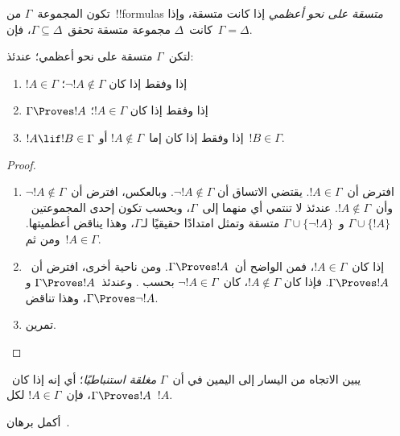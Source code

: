 \documentclass[../../../include/open-logic-section]{subfiles}
\begin{document}


\begin{defn}
تكون المجموعة~$\Gamma$ من~!!{formula}s \emph{متسقة على نحو أعظمي} إذا
كانت متسقة، وإذا كانت~$\Delta$ مجموعة متسقة تحقق~$\Gamma\subseteq\Delta$،
فإن~$\Gamma=\Delta$.
\end{defn}

\begin{lem}[لمّة الصدق]
لتكن~$\Gamma$ متسقة على نحو أعظمي؛ عندئذ:
\begin{enumerate}
\item {} $!A\in\Gamma$ إذا وفقط إذا كان
  $\lnot !A\notin\Gamma$؛
\item {} $\Gamma\Proves !A$ إذا وفقط إذا كان
  $!A\in\Gamma$؛
\item {} $!A\lif !B\in\Gamma$ إذا وفقط إذا كان
  إما~$!A\notin\Gamma$ أو~$!B\in\Gamma$.
\end{enumerate}
\end{lem}

\begin{proof}
\begin{enumerate}
\item افترض أن~$!A\in\Gamma$. يقتضي الاتساق أن
  $\lnot !A\notin\Gamma$. وبالعكس، افترض أن~$\lnot !A\notin\Gamma$
  وأن~$!A\notin\Gamma$. عندئذ لا تنتمي أي منهما إلى~$\Gamma$، وبحسب
   تكون إحدى المجموعتين~$\Gamma\cup\{!A\}$
  و~$\Gamma\cup\{\lnot !A\}$ متسقة وتمثل امتدادًا حقيقيًا لـ$\Gamma$،
  وهذا يناقض أعظميتها. ومن ثم~$!A\in\Gamma$.
\item إذا كان~$!A\in\Gamma$، فمن الواضح أن~$\Gamma\Proves !A$.
  ومن ناحية أخرى، افترض أن~$\Gamma\Proves !A$. فإذا كان
  $!A\notin\Gamma$، كان~$\lnot !A\in\Gamma$ بحسب
  . وعندئذ~$\Gamma\Proves !A$ و
  $\Gamma\Proves\lnot !A$، وهذا تناقض.
\item تمرين.
\end{enumerate}
\end{proof}

يبين الاتجاه من اليسار إلى اليمين في
 أن~$\Gamma$ \emph{مغلقة استنباطيًا}؛
أي إنه إذا كان~$\Gamma\Proves !A$، فإن~$!A\in\Gamma$ لكل~$!A$.

\begin{prob}
  أكمل برهان~.
\end{prob}
\end{document}

